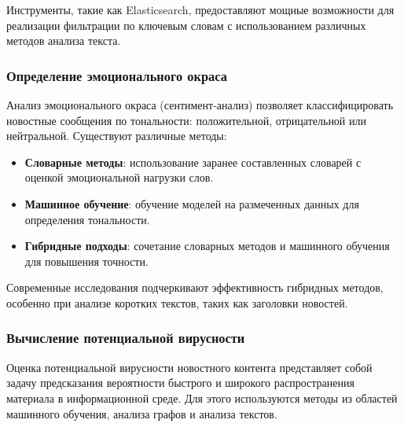 Инструменты, такие как Elasticsearch, предоставляют мощные возможности для реализации фильтрации по ключевым словам с использованием различных методов анализа текста.

\subsubsection{Определение эмоционального окраса}\label{subsubsec:anal113}
Анализ эмоционального окраса (сентимент-анализ) позволяет классифицировать новостные сообщения по тональности: положительной, отрицательной или нейтральной.
Существуют различные методы:
\begin{itemize}
    \item \textbf{Словарные методы}: использование заранее составленных словарей с оценкой эмоциональной нагрузки слов.
    \item \textbf{Машинное обучение}: обучение моделей на размеченных данных для определения тональности.
    \item \textbf{Гибридные подходы}: сочетание словарных методов и машинного обучения для повышения точности.
\end{itemize}

Современные исследования подчеркивают эффективность гибридных методов, особенно при анализе коротких текстов, таких как заголовки новостей.

\subsubsection{Вычисление потенциальной вирусности}\label{subsubsec:anal114}
Оценка потенциальной вирусности новостного контента представляет собой задачу предсказания вероятности быстрого и широкого распространения материала в информационной среде. Для этого используются методы из областей машинного обучения, анализа графов и анализа текстов.


